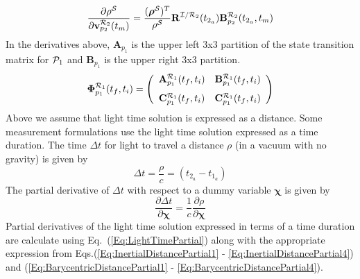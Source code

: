 %
\begin{equation}
   \frac{\partial \rho^\mcS}{\partial \mathbf{v}^{\mcR_2}_{p_{2}}(t_m)} =  \frac{(\boldsymbol{\rho}^\mcS)^T}{\rho^\mcS}\mathbf{R}^{\mathcal{I}/\mathcal{R}_2}(t_{2_a})\mathbf{B}_{p_2}^{\mcR_2}(t_{2_a},t_m)
   \label{Eq:BarycentricDistancePartial4}
\end{equation}
%
In the derivatives above, $\mathbf{A}_{p_1}$ is the upper left 3x3 partition of the state transition matrix for $\mcP_1$ and $\mathbf{B}_{p_1}$ is the upper right 3x3 partition.
%
\begin{equation}
     \boldsymbol{\Phi}_{p_1}^{\mcR_1}(t_f,t_i) =
     \left(\begin{array}{ccc}
              \mathbf{A}_{p_1}^{\mcR_1}(t_f,t_i) & \mathbf{B}_{p_1}^{\mcR_1}(t_f,t_i)\vspace{.1 in}\\
              \mathbf{C}_{p_1}^{\mcR_1}(t_f,t_i) & \mathbf{C}_{p_1}^{\mcR_1}(t_f,t_i)
     \end{array}\right)
\end{equation}
%
Above we assume that light time solution is expressed as a distance.  Some measurement formulations use the light time solution expressed as a time duration.  The time $\Delta t$ for light to travel a distance $\rho$ (in a vacuum with no gravity) is given by
%
\begin{equation}
    \Delta t = \frac{\rho}{c} = (t_{2_a} - t_{1_a})
\end{equation}
%
The partial derivative of $\Delta t$ with respect to a dummy variable $\boldsymbol{\chi}$ is given by
%
\begin{equation}
     \frac{\partial \Delta t}{\partial \boldsymbol{\chi} } = \frac{1}{c}\frac{\partial \rho}{\partial \boldsymbol{\chi}} \label{Eq:LightTimePartial}
\end{equation}
%
Partial derivatives of the light time solution expressed in terms of a time duration are calculate using Eq.~(\ref{Eq:LightTimePartial}) along with the appropriate expression from Eqs.(\ref{Eq:InertialDistancePartial1} - \ref{Eq:InertialDistancePartial4}) and (\ref{Eq:BarycentricDistancePartial1} - \ref{Eq:BarycentricDistancePartial4}).


